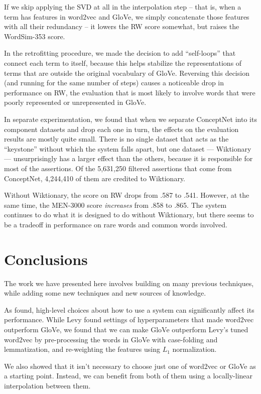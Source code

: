 \documentclass[11pt,letterpaper]{article}
\begin{document}
If we skip applying the SVD at all in the interpolation step -- that is, when a
term has features in word2vec and GloVe, we simply concatenate those features
with all their redundancy -- it lowers the RW score somewhat, but raises the
WordSim-353 score.

In the retrofitting procedure, we made the decision to add ``self-loops'' that
connect each term to itself, because this helps stabilize the
representations of terms that are outside the original vocabulary of GloVe.
Reversing this decision (and running for the same number of steps) causes a
noticeable drop in performance on RW, the evaluation that is most likely to
involve words that were poorly represented or unrepresented in GloVe.

In separate experimentation, we found that when we separate ConceptNet into its
component datasets and drop each one in turn, the effects on the evaluation
results are mostly quite small. There is no single dataset that acts as the
``keystone'' without which the system falls apart, but one dataset ---
Wiktionary --- unsurprisingly has a larger effect than the others, because it
is responsible for most of the assertions. Of the 5,631,250 filtered assertions
that come from ConceptNet, 4,244,410 of them are credited to Wiktionary.

Without Wiktionary, the score on RW drops from .587 to .541. However, at the
same time, the MEN-3000 score {\em increases} from .858 to .865. The system
continues to do what it is designed to do without Wiktionary, but there seems to
be a tradeoff in performance on rare words and common words involved.

\section{Conclusions}

The work we have presented here involves building on many previous techniques,
while adding some new techniques and new sources of knowledge.

As  found, high-level choices about how to use a
system can significantly affect its performance. While Levy found settings of
hyperparameters that made word2vec outperform GloVe, we found that we can make
GloVe outperform Levy's tuned word2vec by pre-processing the words in GloVe
with case-folding and lemmatization, and re-weighting the features using $L_1$
normalization.

We also showed that it isn't necessary to choose just one of word2vec or GloVe
as a starting point. Instead, we can benefit from both of them using a
locally-linear interpolation between them.
\end{document}
